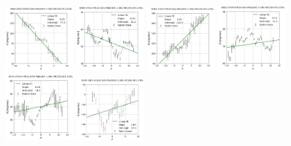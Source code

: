 \documentclass[fleqn,usenatbib]{mnras}
\begin{document}
\begin{figure}
    \centering
    \includegraphics[width=0.23\textwidth]{Images/LINFITS/CPSB-7964-1902-LINFIT-EBARS-MASKED.png}
    \includegraphics[width=0.23\textwidth]{Images/LINFITS/CPSB-8080-3702-LINFIT-EBARS-MASKED.png}
    \includegraphics[width=0.23\textwidth]{Images/LINFITS/CPSB-8081-3702-LINFIT-EBARS-MASKED.png}
    \includegraphics[width=0.23\textwidth]{Images/LINFITS/CPSB-8082-3704-LINFIT-EBARS-MASKED.png}
    \includegraphics[width=0.23\textwidth]{Images/LINFITS/CPSB-8143-3703-LINFIT-EBARS-MASKED.png}
    \includegraphics[width=0.23\textwidth]{Images/LINFITS/CPSB-8144-1902-LINFIT-EBARS-MASKED.png}

\end{figure}
\end{document}
